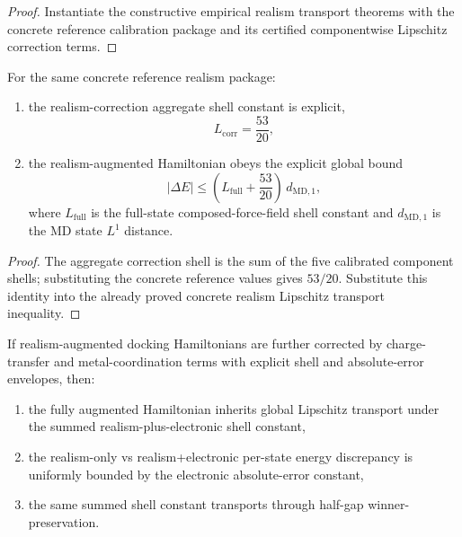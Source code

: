 \begin{proof}
Instantiate the constructive empirical realism transport theorems with the concrete reference calibration package and its certified componentwise Lipschitz correction terms.
\end{proof}

\begin{theorem}\label{thm:biomolecular-reference-realism-explicit-shell-constant}
For the same concrete reference realism package:
\begin{enumerate}
\item the realism-correction aggregate shell constant is explicit,
\[
L_{\mathrm{corr}}=\frac{53}{20},
\]
\item the realism-augmented Hamiltonian obeys the explicit global bound
\[
|\Delta E| \le \left(L_{\mathrm{full}}+\frac{53}{20}\right)\,d_{\mathrm{MD},1},
\]
where $L_{\mathrm{full}}$ is the full-state composed-force-field shell constant and $d_{\mathrm{MD},1}$ is the MD state $L^1$ distance.
\end{enumerate}
\end{theorem}

\begin{proof}
The aggregate correction shell is the sum of the five calibrated component shells; substituting the concrete reference values gives $53/20$. Substitute this identity into the already proved concrete realism Lipschitz transport inequality.
\end{proof}

\begin{theorem}\label{thm:electronic-structure-correction-transport}
If realism-augmented docking Hamiltonians are further corrected by charge-transfer and metal-coordination terms with explicit shell and absolute-error envelopes, then:
\begin{enumerate}
\item the fully augmented Hamiltonian inherits global Lipschitz transport under the summed realism-plus-electronic shell constant,
\item the realism-only vs realism+electronic per-state energy discrepancy is uniformly bounded by the electronic absolute-error constant,
\item the same summed shell constant transports through half-gap winner-preservation.
\end{enumerate}
\end{theorem}

